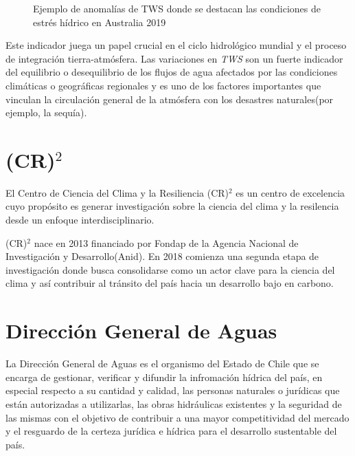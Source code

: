 \begin{figure}[H]
    \centering
          \goodgap
          \vskip -0.1in
    \caption[Ejemplo de anomalías de TWS]{\footnotesize Ejemplo de anomalías de TWS donde se destacan las condiciones de estrés hídrico en Australia 2019}
    \label{logo1}
\end{figure}
Este indicador juega un  papel crucial en el ciclo hidrológico mundial y el proceso de integración tierra-atmósfera. Las variaciones en \textit{TWS} son
un fuerte indicador del equilibrio o desequilibrio de los flujos de agua afectados por las condiciones climáticas o geográficas
regionales y es uno de los factores importantes que vinculan la circulación general de la atmósfera con los desastres naturales(por ejemplo, la sequía)\cite{15}.
%
%
%
%
\section{(CR)$^2$}
El Centro de Ciencia del Clima y la Resiliencia (CR)$^2$ es un centro de excelencia cuyo propósito es generar investigación
sobre la ciencia del clima y la resilencia desde un enfoque interdisciplinario. 

(CR)$^2$ nace en 2013 financiado por Fondap de la Agencia Nacional de Investigación y Desarrollo(Anid). En 2018 comienza una segunda etapa
de investigación donde busca consolidarse como un actor clave para la ciencia del clima y así contribuir al tránsito del país hacia un desarrollo 
bajo en carbono\cite{cr2}.

%
%
%
%
\section{Dirección General de Aguas}
La Dirección General de Aguas es el organismo del Estado de Chile que se encarga de gestionar, verificar y difundir la infromación 
hídrica del país, en especial respecto a su cantidad y calidad, las personas naturales o jurídicas que están autorizadas a utilizarlas,
las obras hidráulicas existentes y la seguridad de las mismas con el objetivo de contribuir a una mayor competitividad 
del mercado y el resguardo de la certeza jurídica e hídrica para el desarrollo sustentable del país\cite{dga}.

%
%
%
%
